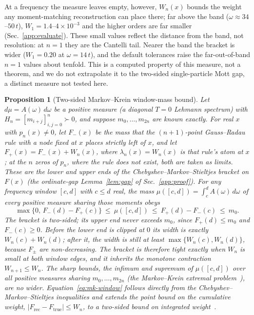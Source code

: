 \documentclass[aps,prb,onecolumn,superscriptaddress,longbibliography,floatfix]{revtex4-2}
\newtheorem{proposition}{Proposition}
\begin{document}
At a frequency the measure leaves empty, however, $W_n(x)$ bounds the weight any moment-matching reconstruction can place there; far above the band ($\omega\approx34$--$50\,t$), $W_1=1.4$--$4\times10^{-3}$ and the higher orders are far smaller (Sec.~\ref{app:evaluate}). These small values reflect the distance from the band, not resolution: at $n=1$ they are the Cantelli tail. Nearer the band the bracket is wider ($W_1=0.20$ at $\omega=14\,t$), and the default tolerances raise the far-out-of-band $n=1$ values about tenfold. This is a computed property of this measure, not a theorem, and we do not extrapolate it to the two-sided single-particle Mott gap, a distinct measure not tested here.

\begin{proposition}[Two-sided Markov--Krein window-mass bound]
\label{prop:markovkrein}
Let $d\mu=A(\omega)\,d\omega$ be a positive measure (a diagonal $T=0$ Lehmann spectrum) with $H_n=[m_{i+j}]_{i,j=0}^{n}\succ0$, and suppose $m_0,\dots,m_{2n}$ are known exactly. For real $x$ with $p_n(x)\neq0$, let $F_-(x)$ be the mass that the $(n{+}1)$-point Gauss--Radau rule with a node fixed at $x$ places strictly left of $x$, and let $F_+(x)=F_-(x)+W_n(x)$, where $\lambda_n(x)=W_n(x)$ is that rule's atom at $x$; at the $n$ zeros of $p_n$, where the rule does not exist, both are taken as limits. These are the lower and upper ends of the Chebyshev--Markov--Stieltjes bracket on $F(x)$ (the ordinate-gap Lemma~\ref{lem:gap} of Sec.~\ref{app:proof}). For any frequency window $[c,d]$ with $c\le d$ real, the mass $\mu([c,d])=\int_c^d A(\omega)\,d\omega$ of \emph{every} positive measure sharing those moments obeys
\begin{equation}
\max\{0,\,F_-(d)-F_+(c)\}\ \le\ \mu([c,d])\ \le\ F_+(d)-F_-(c)\ \le\ m_0 .
\label{eq:mk-window}
\end{equation}
The bracket is two-sided; its upper end never exceeds $m_0$, since $F_+(d)\le m_0$ and $F_-(c)\ge0$. Before the lower end is clipped at $0$ its width is exactly $W_n(c)+W_n(d)$; after it, the width is still at least $\max\{W_n(c),W_n(d)\}$, because $F_\pm$ are non-decreasing. The bracket is therefore tight exactly when $W_n$ is small at both window edges, and it inherits the monotone contraction $W_{n+1}\le W_n$. The sharp bounds, the infimum and supremum of $\mu([c,d])$ over all positive measures sharing $m_0,\dots,m_{2n}$ (the Markov--Krein extremal problem~\cite{KreinNudelman1977}), are no wider. Equation~\eqref{eq:mk-window} follows directly from the Chebyshev--Markov--Stieltjes inequalities and extends the point bound on the cumulative weight, $|F_{\mathrm{rec}}-F_{\mathrm{true}}|\le W_n$, to a two-sided bound on integrated weight~\cite{KreinNudelman1977,KarlinStudden1966,DetteStudden1997,GM2010}.
\end{proposition}
\end{document}
